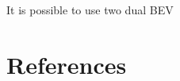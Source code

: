 \documentclass[11pt, a4paper]{article}
\begin{document}
    

    It is possible to use two dual BEV \cite{zhang_dual-bev_2025}

    \section{References}\label{sec:references}

    \printbibliography[heading=bibnumbered, title={Bibliography}]
\end{document}
